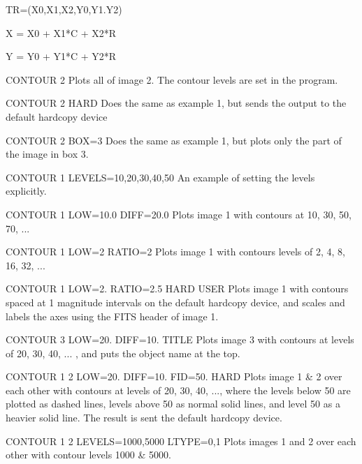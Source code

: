 {\newpage\clearpage
{}%
\begin{hanging} 
  \item{TR=(X0,X1,X2,Y0,Y1.Y2)}
\end{hanging}%
\lthtmlfigureZ
\lthtmlcheckvsize\clearpage}

{\newpage\clearpage
{}%
\begin{hanging} 
  \item{X = X0 + X1*C + X2*R}
  \item{Y = Y0 + Y1*C + Y2*R}
\end{hanging}%
\lthtmlfigureZ
\lthtmlcheckvsize\clearpage}

{\newpage\clearpage
{}%
\begin{example}
  \item[CONTOUR 2\hfill]{
Plots all of image 2.  The contour levels are set in the program.}
  \item[CONTOUR 2 HARD\hfill]{
Does the same as example 1, but sends the output to the default
        hardcopy device}
  \item[CONTOUR 2 BOX=3\hfill]{
Does the same as example 1, but plots only the part of the image in
box 3.}
  \item[CONTOUR 1 LEVELS=10,20,30,40,50\hfill]{
An example of setting the levels explicitly.}
  \item[CONTOUR 1 LOW=10.0 DIFF=20.0\hfill]{
Plots image 1 with contours at 10, 30, 50, 70, ...}
  \item[CONTOUR 1 LOW=2 RATIO=2\hfill]{
Plots image 1 with contours levels of 2, 4, 8, 16, 32, ...}
  \item[CONTOUR 1 LOW=2. RATIO=2.5 HARD USER\hfill]{
Plots image 1 with contours spaced at 1 magnitude intervals on the
default hardcopy device, and scales and labels the axes using the
FITS header of image 1.}
  \item[CONTOUR 3 LOW=20. DIFF=10. TITLE\hfill]{
Plots image 3 with contours at levels of 20, 30, 40, ... , and puts
the object name at the top.}
  \item[CONTOUR 1 2 LOW=20. DIFF=10. FID=50. HARD\hfill]{
        Plots image 1 \& 2 over each other with contours at levels of 20, 30, 
        40, ..., where the levels below 50 are plotted as dashed lines, 
        levels above 50 as normal solid lines, and level 50 as a heavier 
        solid line. The result is sent the default hardcopy device.}
  \item[CONTOUR 1 2 LEVELS=1000,5000 LTYPE=0,1 \hfill]{
        Plots images 1 and 2 over each other with contour levels 1000 \& 5000.
}
\end{example}}
